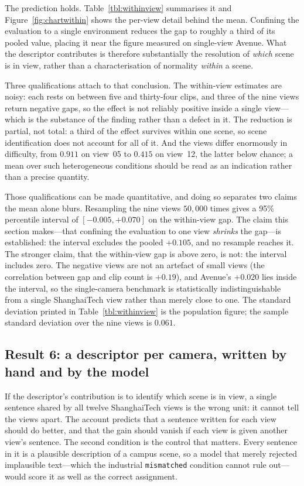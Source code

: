 \documentclass[a4paper,fleqn]{cas-sc}
\begin{document}
The prediction holds. Table~\ref{tbl:withinview} summarises it and
Figure~\ref{fig:chartwithin} shows the per-view detail behind the mean.
Confining the evaluation to a single environment reduces
the gap to roughly a third of its pooled value, placing it near the figure
measured on single-view Avenue. What the descriptor contributes is therefore
substantially the resolution of \emph{which} scene is in view, rather than a
characterisation of normality \emph{within} a scene.

Three qualifications attach to that conclusion. The within-view estimates are
noisy: each rests on between five and thirty-four clips, and three of the nine
views return negative gaps, so the effect is not reliably positive inside a
single view---which is the substance of the finding rather than a defect in it.
The reduction is partial, not total: a third of the effect survives within one
scene, so scene identification does not account for all of it. And the views
differ enormously in difficulty, from $0.911$ on view~05 to $0.415$ on view~12,
the latter below chance; a mean over such heterogeneous conditions should be
read as an indication rather than a precise quantity.

Those qualifications can be made quantitative, and doing so separates two claims
the mean alone blurs. Resampling the nine views $50{,}000$ times gives a 95\%
percentile interval of $[-0.005, +0.070]$ on the within-view gap. The claim this
section makes---that confining the evaluation to one view \emph{shrinks} the
gap---is established: the interval excludes the pooled $+0.105$, and no
resample reaches it. The stronger claim, that the within-view gap is above zero,
is not: the interval includes zero. The negative views are not an artefact of
small views (the correlation between gap and clip count is $+0.19$), and
Avenue's $+0.020$ lies inside the interval, so the single-camera benchmark is
statistically indistinguishable from a single ShanghaiTech view rather than
merely close to one. The standard deviation printed in
Table~\ref{tbl:withinview} is the population figure; the sample standard
deviation over the nine views is $0.061$.

\subsection{Result 6: a descriptor per camera, written by hand and by the model}
\label{sec:res-perview}
If the descriptor's contribution is to identify which scene is in view, a single
sentence shared by all twelve ShanghaiTech views is the wrong unit: it cannot
tell the views apart. The account predicts that a sentence written for each view
should do better, and that the gain should vanish if each view is given another
view's sentence. The second condition is the control that matters. Every
sentence in it is a plausible description of a campus scene, so a model that
merely rejected implausible text---which the industrial \texttt{mismatched}
condition cannot rule out---would score it as well as the correct assignment.
\end{document}
